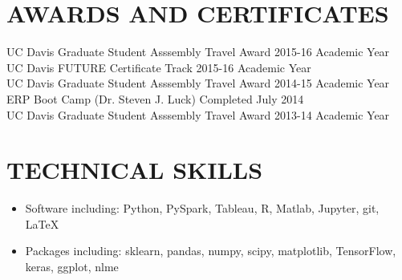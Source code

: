 \documentclass[line,margin,10pt]{res}
\begin{document}
\begin{resume}

\section{AWARDS AND CERTIFICATES}
UC Davis Graduate Student Asssembly Travel Award \hfill 2015-16 Academic Year\\
UC Davis FUTURE Certificate Track \hfill 2015-16 Academic Year\\
UC Davis Graduate Student Asssembly Travel Award \hfill 2014-15 Academic Year\\
ERP Boot Camp (Dr. Steven J. Luck) \hfill Completed July 2014\\
UC Davis Graduate Student Asssembly Travel Award \hfill 2013-14 Academic Year

 \section{TECHNICAL SKILLS} 
 \begin{itemize}[leftmargin=-2pt] \itemsep -2pt
\item [] Software including: Python, PySpark, Tableau, R, Matlab, Jupyter, git, \LaTeX\ %
\item []Packages including: sklearn, pandas, numpy, scipy, matplotlib, TensorFlow, keras, ggplot, nlme
 \end{itemize}


\end{resume}
\end{document}
